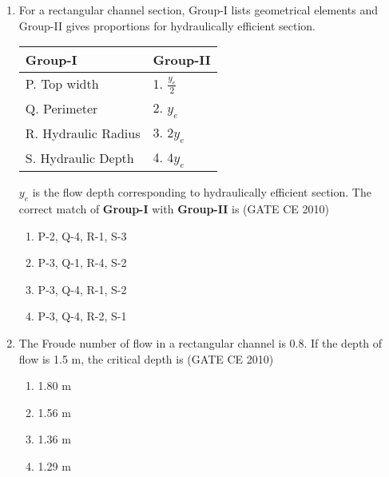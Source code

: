 \documentclass[journal]{IEEEtran}
\begin{document}
\begin{enumerate}
        
    \item For a rectangular channel section, Group-I lists geometrical elements and Group-II gives proportions for hydraulically efficient section.
    \begin{table}[h!]
        \begin{center}
            \begin{tabular}{l|l}
            \textbf{Group-I} & \textbf{Group-II} \\ \hline
            P. Top width & 1. $\frac{y_e}{2}$ \\
            Q. Perimeter & 2. $y_e$ \\
            R. Hydraulic Radius & 3. $2y_e$ \\
            S. Hydraulic Depth & 4. $4y_e$ \\
            \end{tabular}
        \end{center}
    \end{table}

    $y_e$ is the flow depth corresponding to hydraulically efficient section. The correct match of \textbf{Group-I} with \textbf{Group-II} is \hfill (GATE CE 2010)
    \begin{multicols}{2}
        \begin{enumerate}
            \item P-2, Q-4, R-1, S-3
            \item P-3, Q-1, R-4, S-2
            \item P-3, Q-4, R-1, S-2
            \item P-3, Q-4, R-2, S-1
        \end{enumerate}
    \end{multicols}

    \item The Froude number of flow in a rectangular channel is 0.8. If the depth of flow is 1.5 m, the critical depth is \hfill (GATE CE 2010)
    \begin{multicols}{4}
        \begin{enumerate}
            \item 1.80 m
            \item 1.56 m
            \item 1.36 m
            \item 1.29 m
        \end{enumerate}
    \end{multicols}


\end{enumerate}
\end{document}
